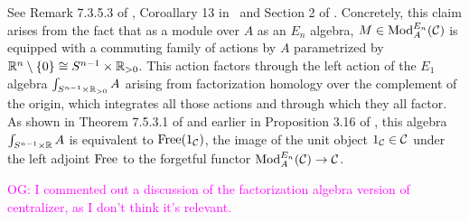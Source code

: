 \documentclass[11pt]{amsart}
\numberwithin{equation}{section}
\def\owen{\textcolor{magenta}{OG: }\textcolor{magenta}}
\begin{document}
See Remark 7.3.5.3 of \cite{LurieHA}, Coroallary 13 in~\cite{GG-Notes} and Section 2 of \cite{FrancisHH}.
Concretely, this claim arises from the fact that as a module over $A$ as an $E_n$ algebra, 
$M \in {\rm Mod}^{E_n}_A(\mathcal C)$ is equipped with a commuting family of actions by $A$ parametrized by $\mathbb R^n \setminus \{0\}\cong S^{n-1} \times \mathbb R_{>0}$.
This action factors through the left action of the $E_1$ algebra $\int_{S^{n-1} \times \mathbb R_{>0}} A$ arising from factorization homology over the complement of the origin,
which integrates all those actions and through which they all factor. 
As shown in Theorem 7.5.3.1 of \cite{LurieHA} and earlier in Proposition 3.16 of \cite{FrancisHH}, 
this algebra $\int_{S^{n-1} \times \mathbb R} A$ is equivalent to ${\rm Free}(1_\mathcal C)$, 
the image of the unit object $1_\mathcal C \in \mathcal C$ under the left adjoint ${\rm Free}$ to the forgetful functor ${\rm Mod}^{E_n}_A(\mathcal C) \to \mathcal C$.

\owen{I commented out a discussion of the factorization algebra version of centralizer, as I don't think it's relevant.}

%
%
\end{document}
